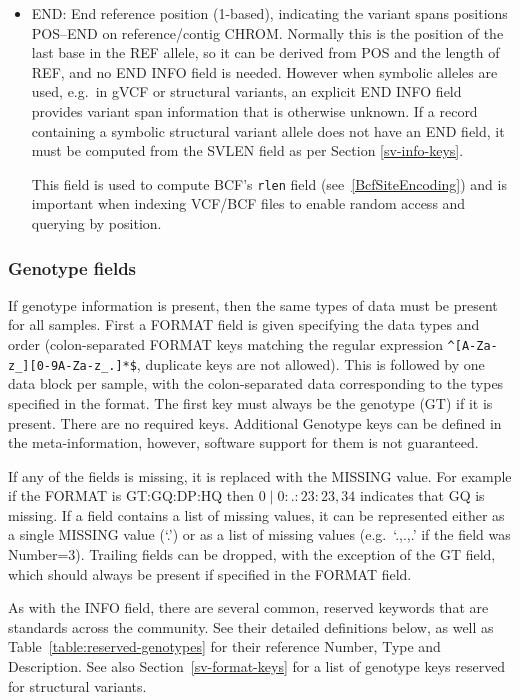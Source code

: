 \documentclass[8pt]{article}
\begin{document}
\begin{itemize}
\renewcommand{\labelitemii}{$\circ$}
\item END: End reference position (1-based), indicating the variant spans positions POS--END on reference/contig CHROM.
Normally this is the position of the last base in the REF allele, so it can be derived from POS and the length of REF, and no END INFO field is needed.
However when symbolic alleles are used, e.g.\ in gVCF or structural variants, an explicit END INFO field provides variant span information that is otherwise unknown.
If a record containing a symbolic structural variant allele does not have an END field, it must be computed from the SVLEN field as per Section \ref{sv-info-keys}.

This field is used to compute BCF's {\tt rlen} field (see~\ref{BcfSiteEncoding}) and is important when indexing VCF/BCF files to enable random access and querying by position.

\end{itemize}

\subsubsection{Genotype fields}
If genotype information is present, then the same types of data must be present for all samples.
First a FORMAT field is given specifying the data types and order (colon-separated FORMAT keys matching the regular expression \texttt{\^{}[A-Za-z\_][0-9A-Za-z\_.]*\$}, duplicate keys are not allowed).
This is followed by one data block per sample, with the colon-separated data corresponding to the types specified in the format.
The first key must always be the genotype (GT) if it is present.
There are no required keys.
Additional Genotype keys can be defined in the meta-information, however, software support for them is not guaranteed.

If any of the fields is missing, it is replaced with the MISSING value.
For example if the FORMAT is GT:GQ:DP:HQ then $0\mid0:.:23:23,34$ indicates that GQ is missing.
If a field contains a list of missing values, it can be represented either as a single MISSING value (`.') or as a list of missing values (e.g.\ `.,.,.' if the field was Number=3).
Trailing fields can be dropped, with the exception of the GT field, which should always be present if specified in the FORMAT field.


As with the INFO field, there are several common, reserved keywords that are standards across the community.
See their detailed definitions below, as well as Table~\ref{table:reserved-genotypes} for their reference Number, Type and Description.
See also Section~\ref{sv-format-keys} for a list of genotype keys reserved for structural variants.
\end{document}
